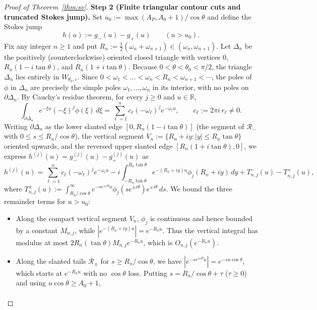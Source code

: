 \documentclass[10pt,reqno]{amsart}
\numberwithin{equation}{section}
\theoremstyle{definition}
\newcommand{\R}{\mathbb{R}}
\newcommand{\cR}{\mathcal{R}}
\begin{document}
\begin{proof}[Proof of Theorem~\ref{thm:sv}]
\smallskip
\noindent\textbf{Step 2 (Finite triangular contour cuts and truncated Stokes jump).}
Set $u_0 := \max(A_P, A_0 + 1)/\cos\theta$ and define the Stokes jump
\[
  h(u) := g_-(u) - g_+(u) \qquad (u > u_0).
\]
Fix any integer $n \ge 1$ and put $R_n := \frac{1}{2}(\omega_n + \omega_{n+1}) \in (\omega_n, \omega_{n+1})$. Let $\Delta_n$ be the positively (counterclockwise) oriented closed triangle with vertices $0$, $R_n(1 - i\tan\theta)$, and $R_n(1 + i\tan\theta)$. Because $0 < \theta < \theta_0 < \pi/2$, the triangle $\Delta_n$ lies entirely in $W_{\theta_0,\varepsilon}$. Since $0 < \omega_1 < \dots < \omega_n < R_n < \omega_{n+1} < \cdots$, the poles of $\phi$ in $\Delta_n$ are precisely the simple poles $\omega_1, \dots, \omega_n$ in its interior, with no poles on $\partial\Delta_n$. By Cauchy's residue theorem, for every $j \ge 0$ and $u \in \R$,
\[
  \int_{\partial\Delta_n} e^{-\xi u} (-\xi)^j \phi(\xi)\,d\xi
  = \sum_{\ell=1}^n c_\ell (-\omega_\ell)^j e^{-\omega_\ell u},
  \qquad c_\ell := 2\pi i\, r_\ell \neq 0.
\]
Writing $\partial\Delta_n$ as the lower slanted edge $[0, R_n(1-i\tan\theta)]$ (the segment of $\cR_-$ with $0 \le s \le R_n/\cos\theta$), the vertical segment $V_n := \{R_n + iy : |y| \le R_n\tan\theta\}$ oriented upwards, and the reversed upper slanted edge $[R_n(1+i\tan\theta), 0]$, we express $h^{(j)}(u) = g_-^{(j)}(u) - g_+^{(j)}(u)$ as
\begin{equation}\label{eq:tri-decomp}
  h^{(j)}(u) = \sum_{\ell=1}^n c_\ell (-\omega_\ell)^j e^{-\omega_\ell u}
  - i \int_{-R_n\tan\theta}^{R_n\tan\theta} e^{-(R_n+iy)u} \phi_j(R_n + iy)\,dy
  + T_{n,j}^-(u) - T_{n,j}^+(u),
\end{equation}
where $T_{n,j}^\pm(u) := \int_{R_n/\cos\theta}^\infty e^{-s e^{\pm i\theta} u} \phi_j(s e^{\pm i\theta}) e^{\pm i\theta}\,ds$. We bound the three remainder terms for $u > u_0$:
\begin{itemize}
  \item Along the compact vertical segment $V_n$, $\phi_j$ is continuous and hence bounded by a constant $M_{n,j}$, while $|e^{-(R_n+iy)u}| = e^{-R_n u}$. Thus the vertical integral has modulus at most $2 R_n (\tan\theta) M_{n,j} e^{-R_n u}$, which is $O_{n,j}(e^{-R_n u})$.
  \item Along the slanted tails $\cR_\pm$ for $s \ge R_n/\cos\theta$, we have $|e^{-s e^{\pm i\theta} u}| = e^{-s u \cos\theta}$, which starts at $e^{-R_n u}$ with no $\cos\theta$ loss. Putting $s = R_n/\cos\theta + \tau$ ($\tau \ge 0$) and using $u\cos\theta \ge A_0 + 1$,
  \begin{align*}

\end{align*}
\end{itemize}
\end{proof}
\end{document}
